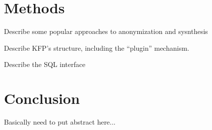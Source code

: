 \documentclass{article}
\begin{document}


\section{Methods}

Describe some popular approaches to anonymization and sysnthesis

Describe KFP's structure, including the ``plugin'' mechanism.

Describe the SQL interface



\section{Conclusion}

Basically need to put abstract here...




\end{document}
